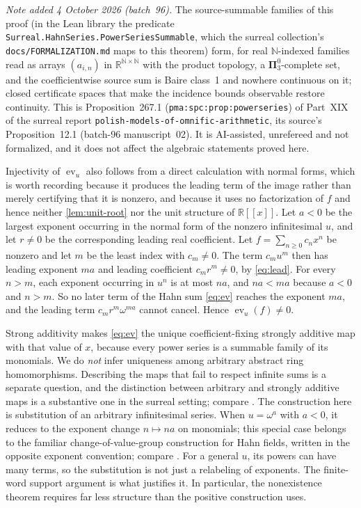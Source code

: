 \documentclass[11pt,letterpaper]{article}
\theoremstyle{definition}
\theoremstyle{remark}
\newenvironment{remark}{\crefalias{theorem}{remark}\remarkx}{\endremarkx}
\newcommand{\R}{\mathbb R}
\newcommand{\ev}{\operatorname{ev}}
\begin{document}
\noindent\emph{Note added 4 October 2026 (batch~96).} The source-summable
families of this proof (in the Lean library the predicate
\nolinkurl{Surreal.HahnSeries.PowerSeriesSummable}, which the surreal
collection's \nolinkurl{docs/FORMALIZATION.md} maps to this theorem) form, for
real $\mathbb N$-indexed families read as arrays $(a_{i,n})$ in
$\R^{\mathbb N\times\mathbb N}$ with the product topology, a
$\boldsymbol\Pi^0_3$-complete set, and the coefficientwise source sum is Baire
class~1 and nowhere continuous on it; closed certificate spaces that make the
incidence bounds observable restore continuity. This is Proposition~267.1
(\nolinkurl{pma:spc:prop:powerseries}) of Part~XIX of the surreal report
\nolinkurl{polish-models-of-omnific-arithmetic}, its source's Proposition~12.1
(batch-96 manuscript~02). It is AI-assisted, unrefereed and not formalized,
and it does not affect the algebraic statements proved here.

\begin{remark}[Injectivity again, by leading terms]\label{rem:leading-inj}
Injectivity of $\ev_u$ also follows from a direct calculation with normal
forms, which is worth recording because it produces the leading term of the
image rather than merely certifying that it is nonzero, and because it uses
no factorization of $f$ and hence neither \cref{lem:unit-root} nor the unit
structure of $\R[[x]]$. Let $a<0$ be the largest exponent occurring in the
normal form of the nonzero infinitesimal $u$, and let $r\ne0$ be the
corresponding leading real coefficient. Let $f=\sum_{n\ge0}c_nx^n$ be nonzero
and let $m$ be the least index with $c_m\ne0$. The term $c_mu^m$ then has
leading exponent $ma$ and leading coefficient $c_mr^m\ne0$, by
\eqref{eq:lead}. For every $n>m$, each exponent occurring in $u^n$ is at most
$na$, and $na<ma$ because $a<0$ and $n>m$. So no later term of the Hahn sum
\eqref{eq:ev} reaches the exponent $ma$, and the leading term
$c_mr^m\omega^{ma}$ cannot cancel. Hence $\ev_u(f)\ne0$.
\end{remark}

Strong additivity makes \eqref{eq:ev} the unique coefficient-fixing strongly
additive map with that value of $x$, because every power series is a summable
family of its monomials. We do \emph{not} infer uniqueness among arbitrary
abstract ring homomorphisms. Describing the maps that fail to respect infinite
sums is a separate question, and the distinction between arbitrary and
strongly additive maps is a substantive one in the surreal setting; compare
\citep[Sections 3 and 4]{KKS}. The construction here is substitution of an
arbitrary infinitesimal series. When $u=\omega^a$ with $a<0$, it reduces to
the exponent change $n\mapsto na$ on monomials; this special case belongs
to the familiar change-of-value-group construction for Hahn fields, written
in the opposite exponent convention; compare \citep[Section 2.3]{KKS}.
For a general $u$, its powers can have many terms, so the substitution is
not just a relabeling of exponents. The finite-word support argument is what
justifies it. In particular, the nonexistence theorem requires far less
structure than the positive construction uses.
\end{document}
